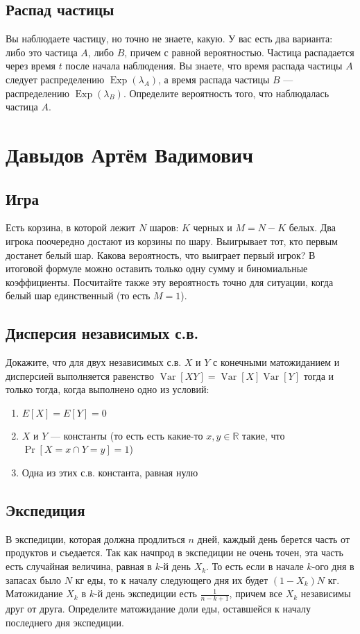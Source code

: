 \documentclass[12pt]{article}
\newcommand\R{\mathbb{R}}
\DeclareMathOperator{\Exp}{Exp}
\DeclareMathOperator{\Var}{Var}
\begin{document}
\subsection{Распад частицы}
Вы наблюдаете частицу, но точно не знаете, какую. У вас есть два варианта: либо это частица $A$, либо $B$, причем с равной вероятностью. Частица распадается через время $t$ после начала наблюдения. Вы знаете, что время распада частицы $A$ следует распределению $\Exp(\lambda_A)$, а время распада частицы $B$ --- распределению $\Exp(\lambda_B)$. Определите вероятность того, что наблюдалась частица $A$.

\newpage
\section{Давыдов Артём Вадимович}

\subsection{Игра}
Есть корзина, в которой лежит $N$ шаров: $K$ черных и $M = N - K$ белых. Два игрока поочередно достают из корзины по шару. Выигрывает тот, кто первым достанет белый шар. Какова вероятность, что выиграет первый игрок? В итоговой формуле можно оставить только одну сумму и биномиальные коэффициенты. Посчитайте также эту вероятность точно для ситуации, когда белый шар единственный (то есть $M = 1$).

\subsection{Дисперсия независимых с.в.}
Докажите, что для двух независимых с.в. $X$ и $Y$ с конечными матожиданием и дисперсией выполняется равенство $\Var[XY] = \Var[X]\Var[Y]$ тогда и только тогда, когда выполнено одно из условий:
\begin{enumerate}
    \item $E[X] = E[Y] = 0$
    \item $X$ и $Y$ --- константы (то есть есть какие-то $x, y \in \R$ такие, что $\Pr[X = x \cap Y = y] = 1$)
    \item Одна из этих с.в. константа, равная нулю
\end{enumerate}

\subsection{Экспедиция}
В экспедиции, которая должна продлиться $n$ дней, каждый день берется часть от продуктов и съедается. Так как начпрод в экспедиции не очень точен, эта часть есть случайная величина, равная в $k$-й день $X_k$. То есть если в начале $k$-ого дня в запасах было $N$ кг еды, то к началу следующего дня их будет $(1 - X_k)N$ кг. Матожидание $X_k$ в $k$-й день экспедиции есть $\frac{1}{n - k + 1}$, причем все $X_k$ независимы друг от друга. Определите матожидание доли еды, оставшейся к началу последнего дня экспедиции.
\end{document}
